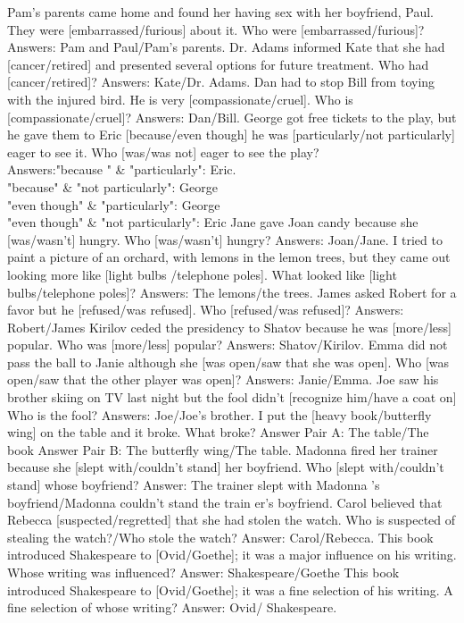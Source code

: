 \begin{foo}
Pam's parents came home and found her having sex with her boyfriend, Paul. They were [embarrassed/furious] about it. Who were [embarrassed/furious]? Answers: Pam and Paul/Pam's parents.
Dr. Adams informed Kate that she had [cancer/retired] and presented several options for future treatment. Who had [cancer/retired]? Answers: Kate/Dr. Adams.
Dan had to stop Bill from toying with the injured bird. He is very [compassionate/cruel]. Who is [compassionate/cruel]? Answers: Dan/Bill.
George got free tickets to the play, but he gave them to Eric [because/even though] he was [particularly/not particularly] eager to see it. Who [was/was not] eager to see the play? \\Answers:"because " \& "particularly": Eric.\\ "because" \&  "not particularly": George\\"even though"  \& "particularly":  George\\"even though" \&  "not particularly": Eric
Jane gave Joan candy because she [was/wasn't] hungry. Who [was/wasn't] hungry? Answers: Joan/Jane.
I tried to paint a picture of an orchard, with lemons in the lemon trees, but they came out looking more like [light bulbs /telephone poles]. What looked like [light bulbs/telephone poles]? Answers: The lemons/the trees.
James asked Robert for a favor but he [refused/was refused]. Who [refused/was refused]? Answers: Robert/James
Kirilov ceded the presidency to Shatov because he was [more/less] popular. Who was [more/less] popular? Answers: Shatov/Kirilov.
Emma did not pass the ball to Janie although she [was open/saw that she was open]. Who [was open/saw that the other player was open]? Answers: Janie/Emma.
Joe saw his brother skiing on TV last night but the fool didn't [recognize him/have a coat on] Who is the fool? Answers: Joe/Joe's brother.
I put the [heavy book/butterfly wing] on the table and it broke. What broke? Answer Pair A: The table/The book Answer Pair B: The butterfly wing/The table.
Madonna fired her trainer because she [slept with/couldn't stand] her boyfriend. Who [slept with/couldn't stand] whose boyfriend? Answer: The trainer slept with Madonna 's boyfriend/Madonna couldn't stand the  train er's boyfriend.
Carol believed that Rebecca [suspected/regretted] that she had stolen the watch. Who is suspected of stealing the watch?/Who stole the watch? Answer: Carol/Rebecca.
This book introduced Shakespeare to [Ovid/Goethe]; it was a major influence on his writing. Whose writing was influenced? Answer: Shakespeare/Goethe
This book introduced Shakespeare to [Ovid/Goethe]; it was a fine selection of his writing. A fine selection of whose writing? Answer: Ovid/ Shakespeare.

\end{foo}
